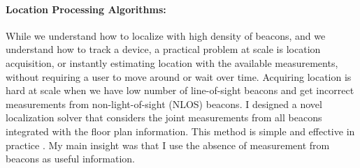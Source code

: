 \documentclass[11pt]{article}
\begin{document}
\paragraph{Location Processing Algorithms: }
While we understand how to localize with  high density of beacons, and we understand how to track a device, a practical problem at scale is location acquisition, or instantly estimating location with the available measurements, without requiring a user to move around or wait over time.  
Acquiring location is hard at scale when we have low number of line-of-sight beacons and get incorrect measurements from non-light-of-sight (NLOS) beacons. 
I designed a novel localization solver that considers the joint measurements from all beacons integrated with the floor plan information. This method is simple and effective in practice \cite{rajagopal2018enhancing}. 
My main insight was that I use the absence of measurement from beacons as useful information. %
\end{document}
